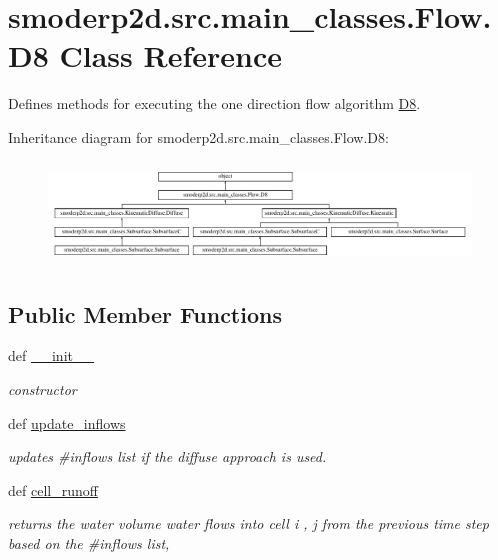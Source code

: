 \hypertarget{classsmoderp2d_1_1src_1_1main__classes_1_1Flow_1_1D8}{\section{smoderp2d.\-src.\-main\-\_\-classes.\-Flow.\-D8 Class Reference}
\label{classsmoderp2d_1_1src_1_1main__classes_1_1Flow_1_1D8}
}


Defines methods for executing the one direction flow algorithm \hyperlink{classsmoderp2d_1_1src_1_1main__classes_1_1Flow_1_1D8}{D8}.  


Inheritance diagram for smoderp2d.\-src.\-main\-\_\-classes.\-Flow.\-D8\-:\begin{figure}[H]
\begin{center}
\leavevmode
\includegraphics[height=2.753196cm]{classsmoderp2d_1_1src_1_1main__classes_1_1Flow_1_1D8}
\end{center}
\end{figure}
\subsection*{Public Member Functions}
\begin{DoxyCompactItemize}
\item 
def \hyperlink{classsmoderp2d_1_1src_1_1main__classes_1_1Flow_1_1D8_a67744c5c6a4fe44565c0bdd52f513413}{\-\_\-\-\_\-init\-\_\-\-\_\-}
\begin{DoxyCompactList}\small\item\em constructor \end{DoxyCompactList}\item 
def \hyperlink{classsmoderp2d_1_1src_1_1main__classes_1_1Flow_1_1D8_a2c6113c6519048d1cd03869a270fad2e}{update\-\_\-inflows}
\begin{DoxyCompactList}\small\item\em updates \#inflows list if the diffuse approach is used. \end{DoxyCompactList}\item 
def \hyperlink{classsmoderp2d_1_1src_1_1main__classes_1_1Flow_1_1D8_a0a85901450ca94f202da3a609b4797eb}{cell\-\_\-runoff}
\begin{DoxyCompactList}\small\item\em returns the water volume water flows into cell i , j from the previous time step based on the \#inflows list, \par
\end{DoxyCompactList}\end{DoxyCompactItemize}
